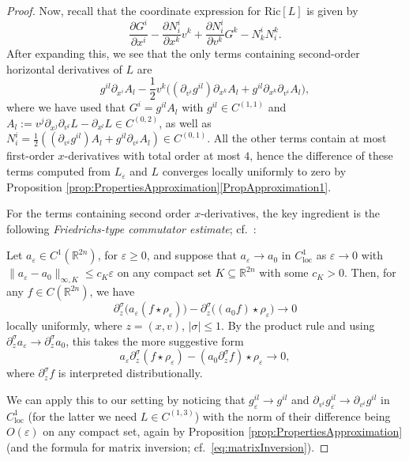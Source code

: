 \documentclass[a4paper,11pt]{article}
\numberwithin{equation}{section}
\theoremstyle{definition}
\theoremstyle{plain}
\newcommand{\R}{\mathbb R}
\newcommand{\eps}{\varepsilon}
\newcommand{\Ric}{\mathrm{Ric}}
\newcommand{\loc}{\mathrm{loc}}
\begin{document}
\begin{proof}
Now, recall that the coordinate expression for $\Ric[L]$ is given by
\begin{equation*}
    \frac{\partial G^i}{\partial x^i} - \frac{\partial N^i_i}{\partial x^k}v^k + \frac{\partial N^i_i}{\partial v^k}G^k - N^i_kN^k_i.
\end{equation*}
After expanding this, we see that the only terms containing second-order horizontal derivatives of $L$ are
\begin{equation*}
    g^{il} \partial_{x^i} A_l - \frac{1}{2}v^k \bigl( (\partial_{v^i}g^{il})\partial_{x^k}A_l + g^{il} \partial_{x^k} \partial_{v^i}A_l \bigr),
\end{equation*}
where we have used that $G^{i} = g^{il} A_l$ with $g^{il} \in C^{(1,1)}$ and $A_l := v^j \partial_{x^j} \partial_{v^l} L - \partial_{x^l} L \in C^{(0,2)}$, as well as $N_i^i = \frac{1}{2}((\partial_{v^i}g^{il})A_l + g^{il} \partial_{v^i}A_l) \in C^{(0,1)}$.
All the other terms contain at most first-order $x$-derivatives with total order at most $4$, hence the difference of these terms computed from $L_\eps$ and $L$ converges locally uniformly to zero by Proposition \ref{prop:PropertiesApproximation}\ref{PropApproximation1}.

For the terms containing second order $x$-derivatives, the key ingredient is the following \emph{Friedrichs-type commutator estimate}; cf.\ \cite[Lemma 4.9]{Graf-SingularityC1}:

Let $a_\eps \in C^1(\R^{2n})$, for $\eps \geq 0$, and suppose that $a_\eps \rightarrow a_0$ in $C^1_{\loc}$ as $\eps \rightarrow 0$   with $\| a_\eps - a_0\|_{\infty,K} \leq c_K \eps $ on any compact set $K \subseteq \R^{2n}$ with some $c_K>0$.
Then, for any $f \in C(\R^{2n})$, we have 
\begin{equation}\label{eq:Friedrichs}
    \partial_{z}^\sigma\bigl(a_\eps (f \star \rho_\eps)\bigr) - \partial_{z}^\sigma\bigl((a_0f) \star \rho_\eps\bigr) \rightarrow 0
\end{equation}
locally uniformly, where $z=(x,v)$, $|\sigma| \le 1$.
By the product rule and using $\partial_z^{\sigma} a_\eps \rightarrow \partial_z^{\sigma} a_0$, this takes the more suggestive form
\begin{equation*}
    a_\eps \partial_z^{\sigma} (f\star \rho_\eps) - (a_0 \partial_z^{\sigma} f)\star \rho_\eps\rightarrow 0,
\end{equation*}
where $\partial_z^{\sigma} f$ is interpreted distributionally.

We can apply this to our setting by noticing that $g^{il}_\eps \rightarrow g^{il}$ and $\partial_{v^i}g_\eps^{il} \rightarrow \partial_{v^i}g^{il}$ in $C^1_\loc$ (for the latter we need $L \in C^{(1,3)}$) with the norm of their difference being $O(\eps)$ on any compact set, again by Proposition \ref{prop:PropertiesApproximation} (and the formula for matrix inversion; cf.\ \eqref{eq:matrixInversion}).


\end{proof}
\end{document}
